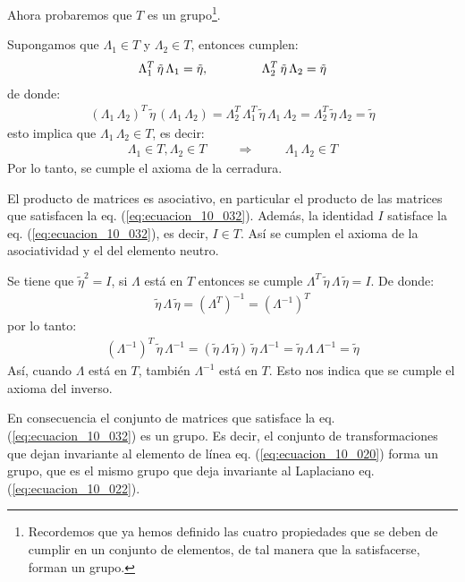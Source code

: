Ahora probaremos que $T$ es un grupo\footnote{Recordemos que ya hemos definido las cuatro propiedades que se deben de cumplir en un conjunto de elementos, de tal manera que la satisfacerse, forman un grupo.}.
\par
Supongamos que $\Lambda_{1} \in T$ y $\Lambda_{2} \in T$, entonces cumplen:
\begin{align}
\Lambda_{1}^{T} \, \tilde{\eta} \, \Lambda_{1} = \tilde{\eta}, \hspace{1.5cm} \Lambda_{2}^{T} \, \tilde{\eta} \, \Lambda_{2} = \tilde{\eta}
\label{eq:ecuacion_10_033}
\end{align}
de donde:
\begin{align}
(\Lambda_{1} \, \Lambda_{2})^{T} \, \tilde{\eta} \, (\Lambda_{1} \, \Lambda_{2}) = \Lambda_{2}^{T} \, \Lambda_{1}^{T} \, \tilde{\eta} \, \Lambda_{1} \, \Lambda_{2} = \Lambda_{2}^{T} \, \tilde{\eta} \, \Lambda_{2} = \tilde{\eta}
\label{eq:ecuacion_10_034}
\end{align}
esto implica que $\Lambda_{1} \, \Lambda_{2} \in T$, es decir:
\begin{align}
\Lambda_{1} \in T, \Lambda_{2} \in T \hspace{1cm} \Rightarrow \hspace{1cm} \Lambda_{1} \, \Lambda_{2} \in T
\label{eq:ecuacion_10_035}
\end{align}
Por lo tanto, se cumple el axioma de la cerradura.
\par
El producto de matrices es asociativo, en particular el producto de las matrices que satisfacen la eq. (\ref{eq:ecuacion_10_032}). Además, la identidad $I$ satisface la eq. (\ref{eq:ecuacion_10_032}), es decir, $I \in T$. Así se cumplen el axioma de la asociatividad y el del elemento
neutro.
\par
Se tiene que $\tilde{\eta}^{2} = I$, si $\Lambda$ está en $T$ entonces se cumple $\Lambda^{T} \, \tilde{\eta} \, \Lambda \, \tilde{\eta} = I$. De donde:
\begin{align}
\tilde{\eta} \, \Lambda \, \tilde{\eta} = \left( \Lambda^{T} \right)^{-1} = \left( \Lambda^{-1} \right)^{T}
\label{eq:ecuacion_10_036}
\end{align}
por lo tanto:
\begin{align}
\left( \Lambda^{-1} \right)^{T}\, \tilde{\eta} \, \Lambda^{-1} = ( \tilde{\eta} \, \Lambda \, \tilde{\eta} ) \, \tilde{\eta} \, \Lambda^{-1} = \tilde{\eta} \, \Lambda \, \Lambda^{-1} = \tilde{\eta}
\label{eq:ecuacion_10_037}
\end{align}
Así, cuando $\Lambda$ está en $T$, también $\Lambda^{-1}$ está en $T$. Esto nos indica que se cumple el axioma del inverso.
\par
En consecuencia el conjunto de matrices que satisface la eq. (\ref{eq:ecuacion_10_032}) es un grupo. Es decir, el conjunto de transformaciones que dejan invariante al elemento de línea eq. (\ref{eq:ecuacion_10_020}) forma un grupo, que es el mismo grupo que deja invariante al Laplaciano eq. (\ref{eq:ecuacion_10_022}).

